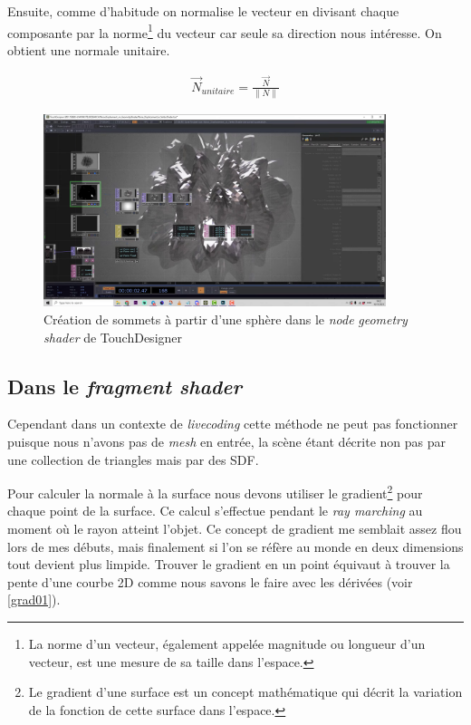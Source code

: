Ensuite, comme d'habitude on normalise le vecteur en divisant chaque composante par la norme\footnote{La norme d'un vecteur, également appelée magnitude ou longueur d'un vecteur, est une mesure de sa taille dans l'espace.} du vecteur car seule sa direction nous intéresse. On obtient une normale unitaire.

\begin{align*} 
\vec{N}_{unitaire} = \frac{\vec{N}}{\|N\|}
\end{align*}

\begin{figure}[h]
    \begin{center}
    \includegraphics[width=10cm]{images/shaders/norm02.png}
    \end{center}
    \caption{Création de sommets à partir d'une sphère dans le \textit{node} \textit{geometry shader} de TouchDesigner}
    \label{norm02}
\end{figure}

\newpage
\subsection*{Dans le \textit{fragment shader}}

Cependant dans un contexte de  \textit{livecoding} cette méthode ne peut pas fonctionner puisque nous n'avons pas de \textit{mesh} en entrée, la scène étant décrite non pas par une collection de triangles mais par des SDF.

Pour calculer la normale à la surface nous devons utiliser le gradient\footnote{
Le gradient d'une surface est un concept mathématique qui décrit la variation de la fonction de cette surface dans l'espace.} pour chaque point de la surface. Ce calcul s'effectue pendant le  \textit{ray marching} au moment où le rayon atteint l'objet. Ce concept de gradient me semblait assez flou lors de mes débuts, mais finalement si l'on se réfère au monde en deux dimensions tout devient plus limpide. Trouver le gradient en un point équivaut à trouver la pente d'une courbe 2D comme nous savons le faire avec les dérivées (voir \ref{grad01}).




